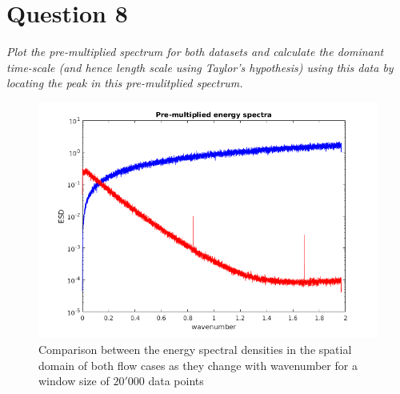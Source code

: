 \section*{Question 8}
\textit{Plot the pre-multiplied spectrum for both datasets and calculate the dominant time-scale (and hence length scale using Taylor’s hypothesis) using this data by locating the peak in this pre-mulitplied spectrum.}

\begin{figure}[!ht]
\centering
\includegraphics[scale=0.8]{./TEXT/esd-n.png}
\caption{Comparison between the energy spectral densities in the spatial domain of both flow cases as they change with wavenumber for a window size of $20'000$ data points}
\label{esd-n}
\end{figure}
